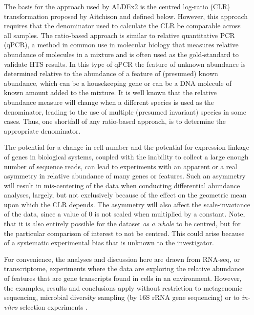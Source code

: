 \documentclass{bmcart}
\begin{document}
The basis for the approach used by ALDEx2 is the centred log-ratio (CLR) transformation proposed by Aitchison \cite{Aitchison:1986} and defined below. However, this approach requires that the denominator used to calculate the CLR be comparable across all samples.  The ratio-based approach is  similar to relative quantitative PCR (qPCR), a method in common use in molecular biology that measures relative abundance of molecules in a mixture \cite{Thellin:1999aa,Vandesompele:2002aa} and is often used as the gold-standard to validate HTS results. In this type of qPCR the feature of unknown abundance is determined relative to the abundance of a feature of (presumed) known abundance, which can be a housekeeping gene or can be a DNA molecule of known amount added to the mixture. It is well known that the relative abundance measure will change when a different species is used as the denominator, leading to the use of multiple (presumed invariant) species in some cases. Thus, one shortfall of any ratio-based approach, is to determine the appropriate denominator. 

The potential for a change in cell number and the potential for expression linkage of genes in biological systems, coupled with the inability to collect a large enough number of sequence reads, can lead to experiments with an apparent or a real asymmetry in relative abundance of many genes or features. Such an asymmetry will result in mis-centering of the data when conducting differential abundance analyses, largely, but not exclusively because of the effect on the geometric mean upon which the CLR depends. The asymmetry will also affect the scale-invariance of the data, since a value of 0 is not scaled when multiplied by a constant. Note, that it is also entirely possible for the dataset \emph{as a whole} to be centred, but for the particular comparison of interest to not be centred. This could arise because of a systematic experimental bias that is unknown to the investigator. 



For convenience, the analyses and discussion here are drawn from RNA-seq, or transcriptome, experiments where the data are exploring the relative abundance of features that are gene transcripts found in cells in an environment. However, the examples, results and conclusions apply without restriction to metagenomic sequencing, microbial diversity sampling (by 16S rRNA gene sequencing) or to \textit{in-vitro} selection experiments \cite{fernandes:2014,mcmurrough:2014}. 
\end{document}
